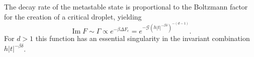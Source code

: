 \documentclass[aps,prl,reprint]{revtex4-1}
\def\[{\begin{equation}}
\def\]{\end{equation}}
\def\im{\mathop{\mathrm{Im}}\nolimits}
\def\c{\mathrm c}
\def\fM{\mathcal M}  %
\def\fS{\mathcal S}  %
\def\fG{\mathcal G}  %
\def\sq{\mathrm{sq}}
\def\dim{d}
\begin{document}
The decay rate of the metastable state is proportional to the Boltzmann factor
for the creation of a critical droplet, yielding
\[
  \im F\sim\Gamma\propto e^{-\beta\Delta F_\c}=e^{-\fG(h|t|^{-\beta\delta})^{-(\dim-1)}}.
\]
For $d>1$ this function has an essential singularity in the invariant
combination $h|t|^{-\beta\delta}$.

\end{document}
